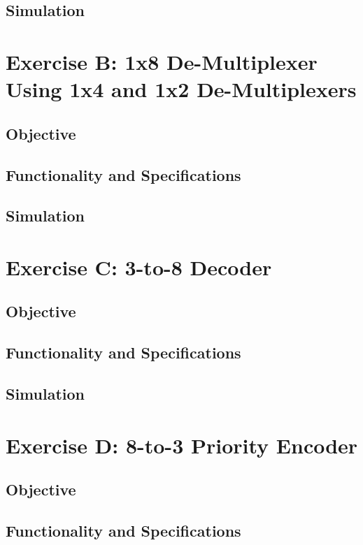 \documentclass[12pt]{article}
\begin{document}
\subsection{Simulation}
\clearpage
\section{Exercise B: 1x8 De-Multiplexer Using 1x4 and 1x2 De-Multiplexers}
\subsection{Objective}

\subsection{Functionality and Specifications}

\subsection{Simulation}

\clearpage
\section{Exercise C: 3-to-8 Decoder}
\subsection{Objective}

\subsection{Functionality and Specifications}

\subsection{Simulation}

\clearpage
\section{Exercise D: 8-to-3 Priority Encoder}
\subsection{Objective}

\subsection{Functionality and Specifications}
\end{document}
